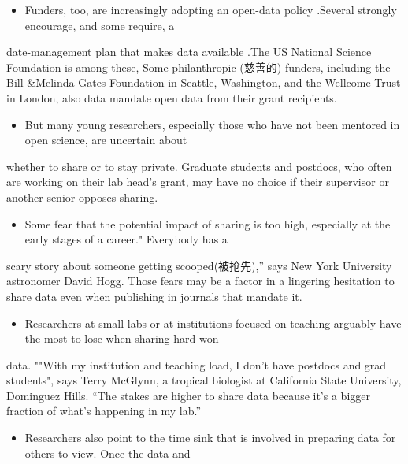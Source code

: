 \documentclass[UTF8,11pt]{ctexart}
\begin{document}
\begin{itemize}[leftmargin=2em,itemsep=.2em,topsep=.4em]\item[E.] Funders, too, are increasingly adopting an open-data policy .Several strongly encourage, and some require, a
\end{itemize}

date-management plan that makes data available .The US National Science Foundation is among these, Some philanthropic (慈善的) funders, including the Bill \&Melinda Gates Foundation in Seattle, Washington, and the Wellcome Trust in London, also data mandate open data from their grant recipients.


\begin{itemize}[leftmargin=2em,itemsep=.2em,topsep=.4em]\item[F.] But many young researchers, especially those who have not been mentored in open science, are uncertain about
\end{itemize}

whether to share or to stay private. Graduate students and postdocs, who often are working on their lab head's grant, may have no choice if their supervisor or another senior opposes sharing.


\begin{itemize}[leftmargin=2em,itemsep=.2em,topsep=.4em]\item[G.] Some fear that the potential impact of sharing is too high, especially at the early stages of a career." Everybody has a
\end{itemize}

scary story about someone getting scooped(被抢先),” says New York University astronomer David Hogg. Those fears may be a factor in a lingering hesitation to share data even when publishing in journals that mandate it.


\begin{itemize}[leftmargin=2em,itemsep=.2em,topsep=.4em]\item[H.] Researchers at small labs or at institutions focused on teaching arguably have the most to lose when sharing hard-won
\end{itemize}

data. ""With my institution and teaching load, I don't have postdocs and grad students", says Terry McGlynn, a tropical biologist at California State University, Dominguez Hills. “The stakes are higher to share data because it's a bigger fraction of what’s happening in my lab.”


\begin{itemize}[leftmargin=2em,itemsep=.2em,topsep=.4em]\item[I.] Researchers also point to the time sink that is involved in preparing data for others to view. Once the data and
\end{itemize}
\end{document}
